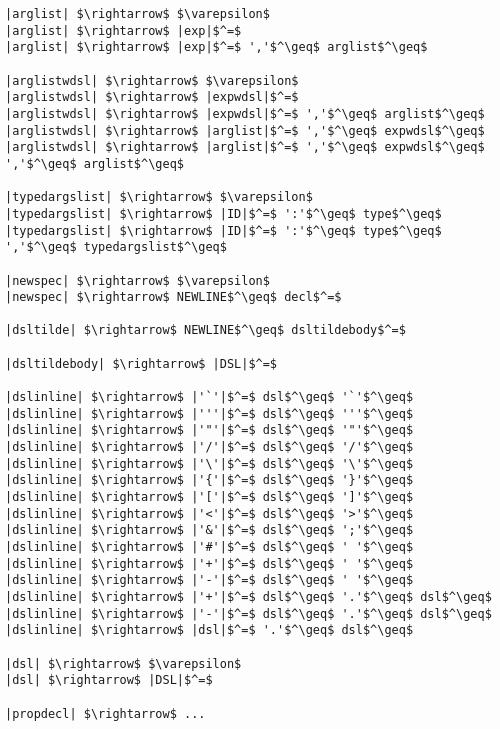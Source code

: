 \begin{lstlisting}[mathescape]
|arglist| $\rightarrow$ $\varepsilon$
|arglist| $\rightarrow$ |exp|$^=$
|arglist| $\rightarrow$ |exp|$^=$ ','$^\geq$ arglist$^\geq$

|arglistwdsl| $\rightarrow$ $\varepsilon$
|arglistwdsl| $\rightarrow$ |expwdsl|$^=$
|arglistwdsl| $\rightarrow$ |expwdsl|$^=$ ','$^\geq$ arglist$^\geq$
|arglistwdsl| $\rightarrow$ |arglist|$^=$ ','$^\geq$ expwdsl$^\geq$
|arglistwdsl| $\rightarrow$ |arglist|$^=$ ','$^\geq$ expwdsl$^\geq$ ','$^\geq$ arglist$^\geq$

|typedargslist| $\rightarrow$ $\varepsilon$
|typedargslist| $\rightarrow$ |ID|$^=$ ':'$^\geq$ type$^\geq$
|typedargslist| $\rightarrow$ |ID|$^=$ ':'$^\geq$ type$^\geq$ ','$^\geq$ typedargslist$^\geq$

|newspec| $\rightarrow$ $\varepsilon$
|newspec| $\rightarrow$ NEWLINE$^\geq$ decl$^=$

|dsltilde| $\rightarrow$ NEWLINE$^\geq$ dsltildebody$^=$

|dsltildebody| $\rightarrow$ |DSL|$^=$

|dslinline| $\rightarrow$ |'`'|$^=$ dsl$^\geq$ '`'$^\geq$
|dslinline| $\rightarrow$ |'''|$^=$ dsl$^\geq$ '''$^\geq$
|dslinline| $\rightarrow$ |'"'|$^=$ dsl$^\geq$ '"'$^\geq$
|dslinline| $\rightarrow$ |'/'|$^=$ dsl$^\geq$ '/'$^\geq$
|dslinline| $\rightarrow$ |'\'|$^=$ dsl$^\geq$ '\'$^\geq$
|dslinline| $\rightarrow$ |'{'|$^=$ dsl$^\geq$ '}'$^\geq$
|dslinline| $\rightarrow$ |'['|$^=$ dsl$^\geq$ ']'$^\geq$
|dslinline| $\rightarrow$ |'<'|$^=$ dsl$^\geq$ '>'$^\geq$
|dslinline| $\rightarrow$ |'&'|$^=$ dsl$^\geq$ ';'$^\geq$
|dslinline| $\rightarrow$ |'#'|$^=$ dsl$^\geq$ ' '$^\geq$
|dslinline| $\rightarrow$ |'+'|$^=$ dsl$^\geq$ ' '$^\geq$
|dslinline| $\rightarrow$ |'-'|$^=$ dsl$^\geq$ ' '$^\geq$
|dslinline| $\rightarrow$ |'+'|$^=$ dsl$^\geq$ '.'$^\geq$ dsl$^\geq$
|dslinline| $\rightarrow$ |'-'|$^=$ dsl$^\geq$ '.'$^\geq$ dsl$^\geq$
|dslinline| $\rightarrow$ |dsl|$^=$ '.'$^\geq$ dsl$^\geq$

|dsl| $\rightarrow$ $\varepsilon$
|dsl| $\rightarrow$ |DSL|$^=$

|propdecl| $\rightarrow$ ...
\end{lstlisting}